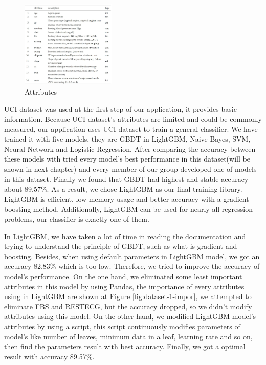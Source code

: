 \documentclass[letterpaper]{article} %
\begin{document}
\begin{figure}[!htbp]
\centering\includegraphics[width=0.4\textwidth]{dataset-1}
\caption{Attributes}
\label{fig:dataset-1}
\end{figure}
UCI dataset was used at the first step of our application, it provides basic information. Because UCI dataset's attributes are limited and could be commonly measured, our application uses UCI dataset to train a general classifier. We have trained it with five models, they are GBDT in LightGBM, Naive Bayes, SVM, Neural Network and Logistic Regression. After comparing the accuracy between these models with tried every model's best performance in this dataset(will be shown in next chapter) and every member of our group developed one of models in this dataset. Finally we found that GBDT had highest and stable accuracy about 89.57\%. As a result, we chose LightGBM as our final training library. LightGBM is efficient, low memory usage and better accuracy with a gradient boosting method. Additionally, LightGBM can be used for nearly all regression problems, our classifier is exactly one of them.

In LightGBM, we have taken a lot of time in reading the documentation and trying to understand the principle of GBDT, such as what is gradient and boosting. Besides, when using default parameters in LightGBM model, we got an accuracy 82.83\% which is too low. Therefore, we tried to improve the accuracy of model's performance. On the one hand, we eliminated some least important attributes in this model by using Pandas, the importance of every attributes using in LightGBM are shown at Figure \ref{fig:dataset-1-impor}, we attempted to eliminate FBS and RESTECG, but the accuracy dropped, so we didn't modify attributes using this model. On the other hand, we modified LightGBM model's attributes by using a script, this script continuously modifies parameters of model's like number of leaves, minimum data in a leaf, learning rate and so on, then find the parameters result with best accuracy. Finally, we got a optimal result with accuracy 89.57\%.
\end{document}
